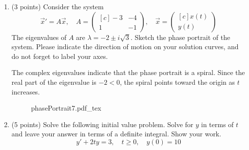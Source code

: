 \documentclass[11pt, titlepage]{article}
\begin{document}
\begin{enumerate}
    \item (3 points) Consider the system
    \begin{equation*}
      \vec{x}' = A \vec{x}, \quad A =
      \begin{pmatrix*}[c]
        -3 & -4 \\
        1 & -1
      \end{pmatrix*}, \quad \vec{x} =
      \begin{pmatrix*}[c]
        x(t) \\
        y(t)
      \end{pmatrix*}
    \end{equation*}
    The eigenvalues of \(A\) are \(\lambda = -2 \pm i \sqrt{3}\).
    Sketch the phase portrait of the system.
    Please indicate the direction of motion on your solution curves, and do not forget to label your axes.

    \begin{solution}
      The complex eigenvalues indicate that the phase portrait is a spiral.
      Since the real part of the eigenvalue is \(-2 < 0\), the spiral points toward the origin as \(t\) increases.

      \begin{figure}[h]
        \centering
        \def\svgwidth{0.9\columnwidth}
        {phasePortrait7.pdf_tex}
      \end{figure}
    \end{solution}

    \pagebreak

    \item (5 points) Solve the following initial value problem.
    Solve for \(y\) in terms of \(t\) and leave your answer in terms of a definite integral.
    Show your work.
    \begin{equation*}
      y' + 2ty = 3, \quad t \geq 0, \quad y(0) = 10
    \end{equation*}


\end{enumerate}
\end{document}
